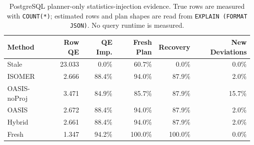 \begin{table}[t]
  \centering
  \small
  \caption{PostgreSQL planner-only statistics-injection evidence. True rows are measured with \texttt{COUNT(*)}; estimated rows and plan shapes are read from \texttt{EXPLAIN (FORMAT JSON)}. No query runtime is measured.}
  \label{tab:postgres_planner_stats_injection}
  \setlength{\tabcolsep}{4pt}
  \begin{tabular}{lrrrrr}
    \toprule
    Method & Row QE & QE Imp. & Fresh Plan & Recovery & New Deviations \\
    \midrule
    Stale & 23.033 & 0.0\% & 60.7\% & 0.0\% & 0.0\% \\
    ISOMER & 2.666 & 88.4\% & 94.0\% & 87.9\% & 2.0\% \\
    OASIS-noProj & 3.471 & 84.9\% & 85.7\% & 87.9\% & 15.7\% \\
    OASIS & 2.672 & 88.4\% & 94.0\% & 87.9\% & 2.0\% \\
    Hybrid & 2.661 & 88.4\% & 94.0\% & 87.9\% & 2.0\% \\
    Fresh & 1.347 & 94.2\% & 100.0\% & 100.0\% & 0.0\% \\
    \bottomrule
  \end{tabular}
\end{table}
